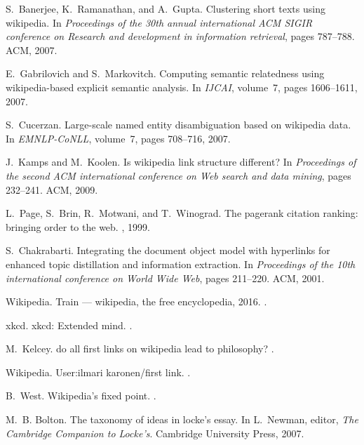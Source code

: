 \documentclass[pre,twocolumn,twoside,byrevtex,superscriptaddress,floatfix]{revtex4-1}
\begin{document}
\begin{thebibliography}{10}
S.~Banerjee, K.~Ramanathan, and A.~Gupta.
\newblock Clustering short texts using wikipedia.
\newblock In {\em Proceedings of the 30th annual international ACM SIGIR
  conference on Research and development in information retrieval}, pages
  787--788. ACM, 2007.

E.~Gabrilovich and S.~Markovitch.
\newblock Computing semantic relatedness using wikipedia-based explicit
  semantic analysis.
\newblock In {\em IJCAI}, volume~7, pages 1606--1611, 2007.

S.~Cucerzan.
\newblock Large-scale named entity disambiguation based on wikipedia data.
\newblock In {\em EMNLP-CoNLL}, volume~7, pages 708--716, 2007.

J.~Kamps and M.~Koolen.
\newblock Is wikipedia link structure different?
\newblock In {\em Proceedings of the second ACM international conference on Web
  search and data mining}, pages 232--241. ACM, 2009.

L.~Page, S.~Brin, R.~Motwani, and T.~Winograd.
\newblock The pagerank citation ranking: bringing order to the web.
, 1999.

S.~Chakrabarti.
\newblock Integrating the document object model with hyperlinks for enhanced
  topic distillation and information extraction.
\newblock In {\em Proceedings of the 10th international conference on World
  Wide Web}, pages 211--220. ACM, 2001.

Wikipedia.
\newblock Train --- wikipedia{,} the free encyclopedia, 2016.
.

xkcd.
\newblock xkcd: Extended mind.
.

M.~Kelcey.
\newblock do all first links on wikipedia lead to philosophy?
.

Wikipedia.
\newblock User:ilmari karonen/first link.
.

B.~West.
\newblock Wikipedia's fixed point.
.

M.~B. Bolton.
\newblock The taxonomy of ideas in locke's essay.
\newblock In L.~Newman, editor, {\em The Cambridge Companion to Locke's}.
  Cambridge University Press, 2007.


\end{thebibliography}
\end{document}
